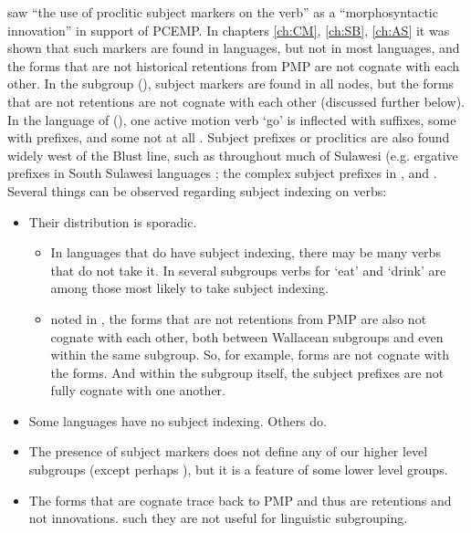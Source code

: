 \citet[258]{Blust1993} saw “the use of proclitic subject markers
on the verb” as a “morphosyntactic innovation” in support of PCEMP.
In chapters \ref{ch:CM}, \ref{ch:SB}, \ref{ch:AS}
it was shown that such markers are found in 
languages, but not in most  languages,
and the forms that are not historical retentions from PMP are
not cognate with each other.
In the  subgroup (),
subject markers are found in all nodes,
but the forms that are not retentions are not cognate with each
other (discussed further below).
In the  language of  (),
one active motion verb ‘go’ is inflected with suffixes,
some with prefixes, and some not at all \citep{Grimes2010a}.
Subject prefixes or proclitics are also found widely west of
the Blust line, such as throughout much of Sulawesi (e.g.
ergative prefixes in South Sulawesi languages \citep{Friberg1991};
the complex subject prefixes in  \citep{vandenBerg1989},
and  \citep[54ff]{vandenBerg2020}.
Several things can be observed regarding subject indexing on
verbs:

\begin{itemize}
\item	Their distribution is sporadic.
	\begin{itemize}
		\item	In languages that do have subject indexing,
					there may be many verbs that do not take it.
					In several subgroups verbs for ‘eat’
					and ‘drink’ are among those most likely to take subject indexing.
		\item	{} noted in ,
					the forms that are not retentions from PMP are also not cognate
					with each other, both between Wallacean subgroups
					and even within the same subgroup.
					So, for example,  forms
					are not cognate with the  forms.
					And within the  subgroup itself,
					the subject prefixes are not fully cognate with one another.
	\end{itemize}
\item	Some languages have no subject indexing. Others do.
\item	The presence of subject markers does not define any of
			our higher level subgroups (except perhaps ),
			but it is a feature of some lower level groups.
\item	The forms that are cognate trace back to PMP
			and thus are retentions and not innovations.
			 such they are not useful for linguistic subgrouping.
\end{itemize}

